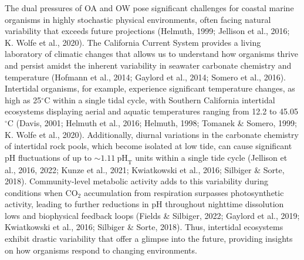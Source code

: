 \documentclass{CSUNthesis}
\begin{document}
The dual pressures of OA and OW pose significant challenges for coastal marine organisms in highly stochastic physical environments, often facing natural variability that exceeds future projections (Helmuth, 1999; Jellison et al., 2016; K. Wolfe et al., 2020). The California Current System provides a living laboratory of climatic changes that allows us to understand how organisms thrive and persist amidst the inherent variability in seawater carbonate chemistry and temperature (Hofmann et al., 2014; Gaylord et al., 2014; Somero et al., 2016). Intertidal organisms, for example, experience significant temperature changes, as high as 25\(^\circ\)C within a single tidal cycle, with Southern California intertidal ecosystems displaying aerial and aquatic temperatures ranging from 12.2 to 45.05\(^\circ\)C (Davis, 2001; Helmuth et al., 2016; Helmuth, 1998; Tomanek \& Somero, 1999; K. Wolfe et al., 2020). Additionally, diurnal variations in the carbonate chemistry of intertidal rock pools, which become isolated at low tide, can cause significant pH fluctuations of up to \(\sim\!1.11\ \mathrm{pH}_\mathrm{T}\) units within a single tide cycle (Jellison et al., 2016, 2022; Kunze et al., 2021; Kwiatkowski et al., 2016; Silbiger \& Sorte, 2018). Community-level metabolic activity adds to this variability during conditions when CO\(_2\) accumulation from respiration surpasses photosynthetic activity, leading to further reductions in pH throughout nighttime dissolution lows and biophysical feedback loops (Fields \& Silbiger, 2022; Gaylord et al., 2019; Kwiatkowski et al., 2016; Silbiger \& Sorte, 2018). Thus, intertidal ecosystems exhibit drastic variability that offer a glimpse into the future, providing insights on how organisms respond to changing environments.
\end{document}
